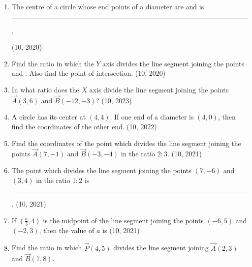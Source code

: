 \begin{enumerate}[label=\thesubsection.\arabic*,ref=\thesubsection.\theenumi]
\item The centre of a circle whose end points of a diameter are  and  is
\rule{1cm}{0.2pt}.

\hfill (10, 2020)
\item Find the ratio in which the $Y$ axis  divides the line segment joining the points  and . Also find the point of intersection.
\hfill (10, 2020)
    \item In what ratio does the $X$ axis divide the line segment joining the points $\vec{A}(3,6)$ and $\vec{B}(-12, -3)$?
    \hfill (10, 2023)
    \item A circle has its center at $(4,4)$. If one end of a diameter is $(4,0)$, then find the coordinates of the other end.
    \hfill (10, 2022)
	\item Find the coordinates of the point which divides the line segment joining the points $\vec{A}(7, -1)$ and $\vec{B}(-3, -4)$ in the ratio $2:3$. \hfill (10, 2021)
		\item The point which divides the line segment joining the points $(7, -6)$ and $(3, 4)$ in the ratio $1:2$ is
\rule{1cm}{0.2pt}.
		\hfill (10, 2021)
		\item If $\left(\frac{a}{3}, 4\right)$ is the midpoint of the line segment joining the points $(-6, 5)$ and $(-2, 3)$, then the value of $a$ is
		\hfill (10, 2021)
		\item Find the ratio in which $\vec{P}(4, 5)$ divides the line segment joining $\vec{A}(2, 3)$ and $\vec{B}(7, 8)$.


\end{enumerate}
